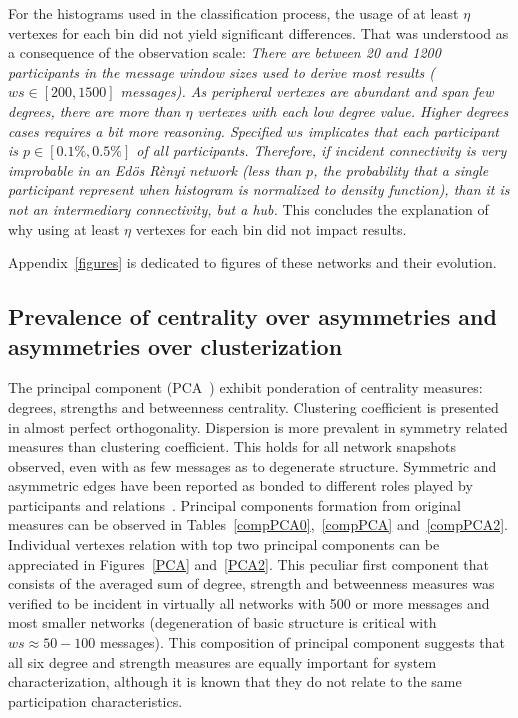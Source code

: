 \documentclass[%
 aip,
 jmp,%
 amsmath,amssymb,
 reprint,%
]{revtex4-1}
\begin{document}
For the histograms used in the classification process, the usage of at least $\eta$ vertexes for each bin did not yield significant differences.
That was understood as a consequence of the observation scale:
\emph{There are between 20 and 1200 participants in the message window sizes used to derive most results ($ws \in [200,1500]$ messages). As peripheral vertexes are abundant and span few degrees, there are more than $\eta$ vertexes with each low degree value. Higher degrees cases requires a bit more reasoning. Specified $ws$ implicates that each participant is $p \in [0.1\%,0.5\%]$ of all participants. Therefore, if incident connectivity is very improbable in an Ed\"os R\`enyi network (less than $p$, the probability that a single participant represent when histogram is normalized to density function), than it is not an intermediary connectivity, but a hub.} This concludes the explanation of why using at least $\eta$ vertexes for each bin did not impact results.

Appendix~\ref{figures} is dedicated to figures of these networks and their evolution.

    \subsection{Prevalence of centrality over asymmetries and asymmetries over clusterization}\label{prevalence}

The principal component (PCA~\cite{pca}) exhibit ponderation of centrality measures: degrees, strengths and betweenness centrality. Clustering coefficient is presented in almost perfect orthogonality. Dispersion is more prevalent in symmetry related measures than clustering coefficient. This holds for all network snapshots observed, even with as few messages as to degenerate structure. Symmetric and asymmetric edges have been reported as bonded to different roles played by participants and relations~\cite{newmanEvolving}. Principal components formation from original measures can be observed in Tables~\ref{compPCA0},~\ref{compPCA} and~\ref{compPCA2}. Individual vertexes relation with top two principal components can be appreciated in Figures~\ref{PCA} and~\ref{PCA2}.
This peculiar first component that consists of the averaged sum of degree, strength and betweenness measures was verified to be incident in virtually all networks with 500 or more messages and most smaller networks (degeneration of basic structure is critical with $ws \approx 50-100$ messages). This composition of principal component suggests that all six degree and strength measures are equally important for system characterization, although it is known that they do not relate to the same participation characteristics.
\end{document}
